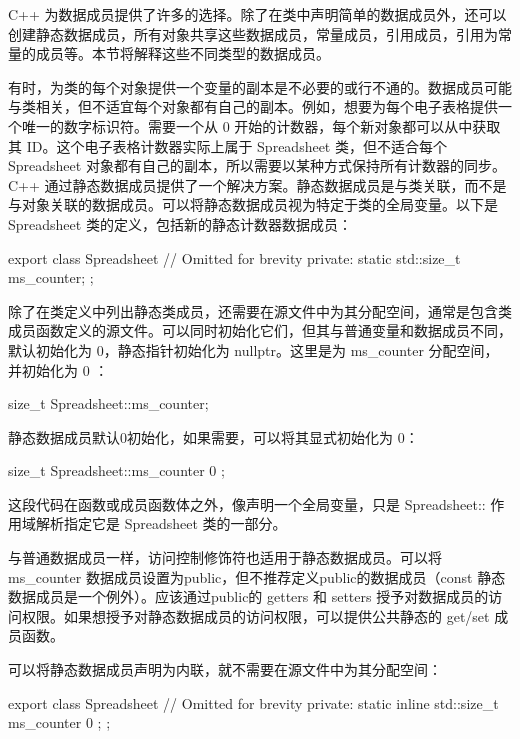 
C++ 为数据成员提供了许多的选择。除了在类中声明简单的数据成员外，还可以创建静态数据成员，所有对象共享这些数据成员，常量成员，引用成员，引用为常量的成员等。本节将解释这些不同类型的数据成员。


有时，为类的每个对象提供一个变量的副本是不必要的或行不通的。数据成员可能与类相关，但不适宜每个对象都有自己的副本。例如，想要为每个电子表格提供一个唯一的数字标识符。需要一个从 0 开始的计数器，每个新对象都可以从中获取其 ID。这个电子表格计数器实际上属于 Spreadsheet 类，但不适合每个 Spreadsheet 对象都有自己的副本，所以需要以某种方式保持所有计数器的同步。C++ 通过静态数据成员提供了一个解决方案。静态数据成员是与类关联，而不是与对象关联的数据成员。可以将静态数据成员视为特定于类的全局变量。以下是 Spreadsheet 类的定义，包括新的静态计数器数据成员：

\begin{cpp}
export class Spreadsheet
{
    // Omitted for brevity
    private:
    static std::size_t ms_counter;
};
\end{cpp}

除了在类定义中列出静态类成员，还需要在源文件中为其分配空间，通常是包含类成员函数定义的源文件。可以同时初始化它们，但其与普通变量和数据成员不同，默认初始化为 0，静态指针初始化为 nullptr。这里是为 ms\_counter 分配空间，并初始化为 0 ：

\begin{cpp}
size_t Spreadsheet::ms_counter;
\end{cpp}

静态数据成员默认0初始化，如果需要，可以将其显式初始化为 0：

\begin{cpp}
size_t Spreadsheet::ms_counter { 0 };
\end{cpp}

这段代码在函数或成员函数体之外，像声明一个全局变量，只是 Spreadsheet:: 作用域解析指定它是 Spreadsheet 类的一部分。

与普通数据成员一样，访问控制修饰符也适用于静态数据成员。可以将 ms\_counter 数据成员设置为public，但不推荐定义public的数据成员（const 静态数据成员是一个例外）。应该通过public的 getters 和 setters 授予对数据成员的访问权限。如果想授予对静态数据成员的访问权限，可以提供公共静态的 get/set 成员函数。


可以将静态数据成员声明为内联，就不需要在源文件中为其分配空间：

\begin{cpp}
export class Spreadsheet
{
    // Omitted for brevity
    private:
        static inline std::size_t ms_counter { 0 };
};
\end{cpp}

